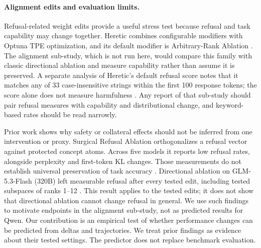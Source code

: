 \paragraph{Alignment edits and evaluation limits.}
Refusal-related weight edits provide a useful stress test because refusal and task capability may change together. Heretic combines configurable modifiers with Optuna TPE optimization, and its default modifier is Arbitrary-Rank Ablation \citep{heretic2026}. The alignment sub-study, which is not run here, would compare this family with classic directional ablation and measure capability rather than assume it is preserved. A separate analysis of Heretic's default refusal score notes that it matches any of 33 case-insensitive strings within the first 100 response tokens; the score alone does not measure harmfulness \citep{pksharma2026heretic}. Any report of that sub-study should pair refusal measures with capability and distributional change, and keyword-based rates should be read narrowly.

Prior work shows why safety or collateral effects should not be inferred from one intervention or proxy. Surgical Refusal Ablation orthogonalizes a refusal vector against protected concept atoms. Across five models it reports low refusal rates, alongside perplexity and first-token KL changes. Those measurements do not establish universal preservation of task accuracy \citep{surgicalrefusal2026}. Directional ablation on GLM-5.3-Flash (320B) left measurable refusal after every tested edit, including tested subspaces of ranks 1--12 \citep{singleattack2026moe}. This result applies to the tested edits; it does not show that directional ablation cannot change refusal in general. We use such findings to motivate endpoints in the alignment sub-study, not as predicted results for Qwen. Our contribution is an empirical test of whether performance changes can be predicted from deltas and trajectories. We treat prior findings as evidence about their tested settings. The predictor does not replace benchmark evaluation.
